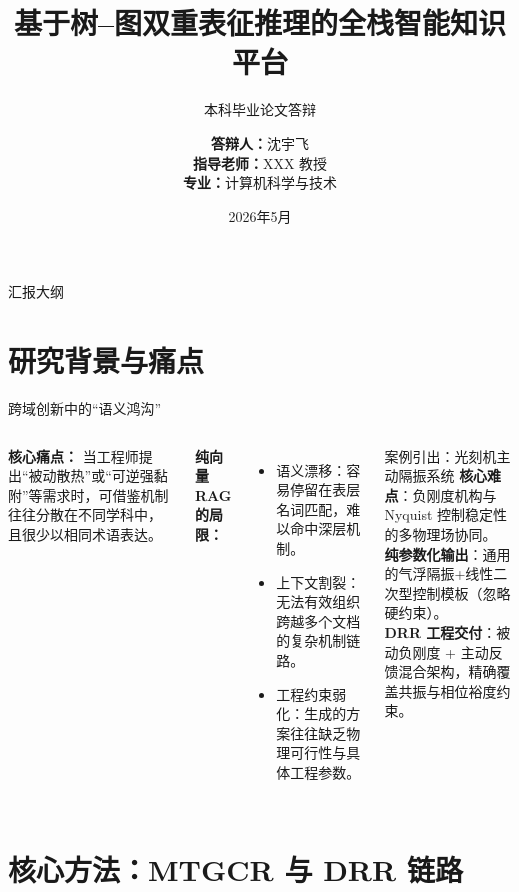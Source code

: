 \documentclass[aspectratio=169, 11pt, xcolor=table]{ctexbeamer}
\title{基于树--图双重表征推理的全栈智能知识平台}
\subtitle{\small 本科毕业论文答辩}
\author{%
    \small
    \textbf{答辩人：}沈宇飞\\
    \textbf{指导老师：}XXX 教授\\
    \textbf{专\qquad 业：}计算机科学与技术%
}
\institute{\large \textbf{暨南大学}}
\date{\footnotesize 2026年5月}
\begin{document}
\maketitle

\begin{frame}{汇报大纲}
    \tableofcontents
\end{frame}

\section{研究背景与痛点}

\begin{frame}{跨域创新中的“语义鸿沟”}
    \small
    \begin{columns}[onlytextwidth]
        \textbf{核心痛点：} 
        当工程师提出“被动散热”或“可逆强黏附”等需求时，可借鉴机制往往分散在不同学科中，且很少以相同术语表达。
        
        \textbf{纯向量 RAG 的局限：}
        \begin{itemize}[<+->]
            \setlength{\itemsep}{0pt}
            \item \alert{语义漂移}：容易停留在表层名词匹配，难以命中深层机制。
            \item \alert{上下文割裂}：无法有效组织跨越多个文档的复杂机制链路。
            \item \alert{工程约束弱化}：生成的方案往往缺乏物理可行性与具体工程参数。
        \end{itemize}

        \vspace{-0.2cm}
        \begin{block}{案例引出：光刻机主动隔振系统}
            \small
            \textbf{核心难点}：负刚度机构与 Nyquist 控制稳定性的多物理场协同。\\
            \textbf{纯参数化输出}：通用的气浮隔振+线性二次型控制模板（忽略硬约束）。\\
            \textbf{DRR 工程交付}：被动负刚度 + 主动反馈混合架构，精确覆盖共振与相位裕度约束。
        \end{block}
    \end{columns}
\end{frame}

\section{核心方法：MTGCR 与 DRR 链路}
\end{document}
